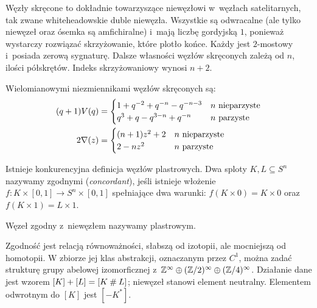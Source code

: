Węzły skręcone to dokładnie towarzyszące niewęzłowi w~węzłach satelitarnych, tak zwane whiteheadowskie duble niewęzła.
Wszystkie są odwracalne (ale tylko niewęzeł oraz ósemka są amfichiralne) i~mają liczbę gordyjską $1$, ponieważ wystarczy rozwiązać skrzyżowanie, które plotło końce.
Każdy jest $2$-mostowy i~posiada zerową sygnaturę.
Dalsze własności węzłów skręconych zależą od $n$, ilości półskrętów.
Indeks skrzyżowaniowy wynosi $n + 2$.

\begin{proposition}
    Wielomianowymi niezmiennikami węzłów skręconych są:
    \begin{align*}
    (q+1)V(q) & = \begin{cases}
        1+q^{-2}+q^{-n}-q^{-n-3} & n \mbox{ nieparzyste} \\
        q^{3}+q-q^{3-n}+q^{-n} & n \mbox{ parzyste}
    \end{cases} \\
    2 \nabla (z) & = \begin{cases}
        (n+1) z^{2} + 2 & n \mbox{ nieparzyste} \\
        2 - nz^2 & n \mbox{ parzyste}
    \end{cases}
    \end{align*}
\end{proposition}


Istnieje konkurencyjna definicja węzłów plastrowych.
Dwa sploty $K, L \subseteq S^n$ nazywamy zgodnymi (\emph{concordant}), jeśli istnieje włożenie $f \colon K \times [0,1] \to S^n \times [0,1]$ spełniające dwa warunki: $f(K \times 0) = K \times 0$ oraz $f(K \times 1) = L \times 1$.

\begin{definition} \label{def:slice_knot}
    Węzeł zgodny z~niewęzłem nazywamy plastrowym.
\end{definition}

Zgodność jest relacją równoważności, słabszą od izotopii, ale mocniejszą od homotopii.
W zbiorze jej klas abstrakcji, oznaczanym przez $C^1$, można zadać strukturę grupy abelowej izomorficznej z~$\mathbb Z^\infty \oplus (\mathbb Z/2)^\infty \oplus (\mathbb Z/4)^\infty$.
Działanie dane jest wzorem $[K] + [L] = [K \mathbin{\#} L]$; niewęzeł stanowi element neutralny.
Elementem odwrotnym do $[K]$ jest $[-K^*]$.

